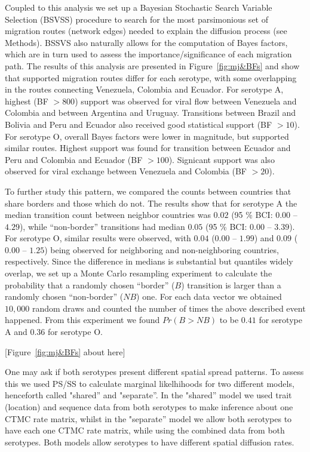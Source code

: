 \documentclass[10pt]{article}
\begin{document}
Coupled to this analysis we set up a Bayesian Stochastic Search Variable Selection (BSVSS) procedure to search for the most parsimonious set of migration routes (network edges) needed to explain the diffusion process (see Methods).
BSSVS also naturally allows for the computation of Bayes factors, which are in turn used to assess the importance/significance of each migration path.
The results of this analysis are presented in Figure~\ref{fig:mj&BFs} and show that supported migration routes differ for each serotype, with some overlapping in the routes connecting Venezuela, Colombia and Ecuador.
For serotype A, highest (BF $>800$) support was observed for viral flow between Venezuela and Colombia and between Argentina and Uruguay.
Transitions between Brazil and Bolivia and Peru and Ecuador also received good statistical support (BF $>10$).
For serotype O, overall Bayes factors were lower in magnitude, but supported similar routes.
Highest support was found for transition between Ecuador and Peru and Colombia and Ecuador (BF $>100$). Signicant support was also observed for viral exchange between Venezuela and Colombia (BF $>20$). 


To further study this pattern, we compared the counts between countries that share borders and those which do not.
The results show that for serotype A the median transition count between neighbor countries was $0.02$ (95 \% BCI: $0.00$ -- $4.29$), while ``non-border'' transitions had median $0.05$ (95 \% BCI: $0.00$ --  $3.39$).
For serotype O, similar results were observed, with $0.04$ ($0.00$ -- $1.99$) and $0.09$ ($0.00$ -- $1.25$) being observed for neighboring and non-neighboring countries, respectively.
Since the difference in medians is substantial but quantiles widely overlap, we set up a Monte Carlo resampling experiment to calculate the probability that a randomly chosen ``border'' ($B$) transition is larger than a randomly chosen ``non-border'' ($NB$) one. For each data vector we obtained $10,000$ random draws and counted the number of times the above described event happened. From this experiment we found $Pr(B>NB)$  to be $0.41$ for serotype A and $0.36$ for serotype O.

\begin{center}
 [Figure~\ref{fig:mj&BFs} about here]
\end{center}

One may ask if both serotypes present different spatial spread patterns.
To assess this we used PS/SS to calculate marginal likelhihoods for two different models, henceforth  called "shared'' and "separate''.
In the "shared'' model we used trait (location) and sequence data  from both serotypes to make inference about one CTMC rate matrix, whilst in the "separate'' model we allow both serotypes to have each one CTMC rate matrix, while using the combined data from both serotypes.
Both models allow serotypes to have different spatial diffusion rates.
\end{document}
